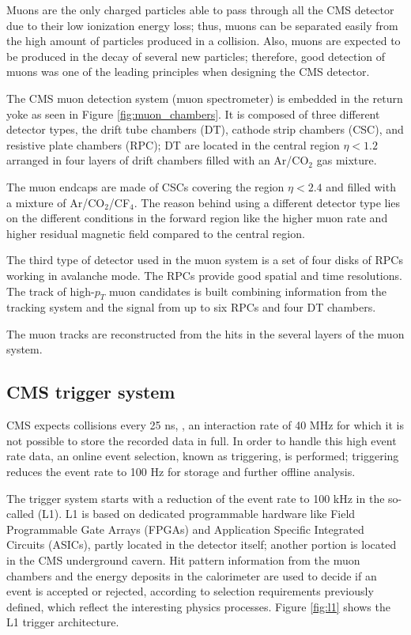 Muons are the only charged particles able to pass through all the CMS detector due to their low ionization energy loss; thus, muons can be separated easily from the high amount of particles produced in a \pp collision. Also, muons are expected to be produced in the decay of several new particles; therefore, good detection of muons was one of the leading principles when designing the CMS detector.

The CMS muon detection system (muon spectrometer) is embedded in the return yoke as seen in Figure \ref{fig:muon_chambers}. It is composed of three different detector types, the drift tube chambers (DT), cathode strip chambers (CSC), and resistive plate chambers (RPC); DT are located in the central region $\eta< 1.2$ arranged in four layers of drift chambers filled with an Ar/CO$_2$ gas mixture.

The muon endcaps are made of CSCs covering the region $\eta< 2.4$ and filled with a mixture of Ar/CO$_2$/CF$_4$. The reason behind using a different detector type lies on the different conditions in the forward region like the higher muon rate and higher residual magnetic field compared to the central region.

The third type of detector used in the muon system is a set of four disks of RPCs working in avalanche mode. The RPCs provide good spatial and time resolutions. The track of high-$p_T$ muon candidates is built combining information from the tracking system and the signal from up to six RPCs and four DT chambers.

The muon tracks are reconstructed from the hits in the several layers of the muon system. 

\subsection{CMS trigger system}

CMS expects \pp collisions every 25 ns, \ie, an interaction rate of 40 MHz for which it is not possible to store the recorded data in full. In order to handle this high event rate data, an online event selection, known as triggering, is performed; triggering reduces the event rate to 100 Hz for storage and further offline analysis.        

The trigger system starts with a reduction of the event rate to 100 kHz in the so-called  (L1). L1 is based on dedicated programmable hardware like Field Programmable Gate Arrays (FPGAs) and Application Specific Integrated Circuits (ASICs), partly located in the detector itself; another portion is located in the CMS underground cavern. Hit pattern information from the muon chambers and the energy deposits in the calorimeter are used to decide if an event is accepted or rejected, according to selection requirements previously defined, which reflect the interesting physics processes. Figure \ref{fig:l1} shows the L1 trigger architecture.

